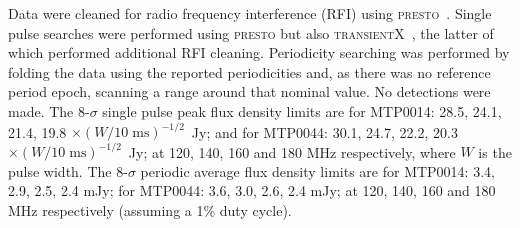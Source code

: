

Data were cleaned for radio frequency interference (RFI) using \textsc{presto}~\citep{presto}. Single pulse searches were performed using \textsc{presto} but also \textsc{transientX}~\citep{men_transientx_2024}, the latter of which performed additional RFI cleaning. Periodicity searching was performed by folding the data using the reported periodicities and, as there was no reference period epoch, scanning a range around that nominal value. No detections were made. The $8$-$
\sigma$ single pulse peak flux density limits are for MTP0014: 28.5, 24.1, 21.4, 19.8 $\times (W/10\;\mathrm{ms})^{-1/2}$~Jy; and for MTP0044: 
30.1, 24.7, 22.2, 20.3 $\times (W/10\;\mathrm{ms})^{-1/2}$~Jy; 
at 120, 140, 160 and 180 MHz respectively, where $W$ is the pulse width. The $8$-$
\sigma$ periodic average flux density limits are for MTP0014: 3.4, 2.9, 2.5, 2.4 mJy; for MTP0044: 3.6, 3.0, 2.6, 2.4 mJy; at 120, 140, 160 and 180 MHz respectively (assuming a 1\% duty cycle).
